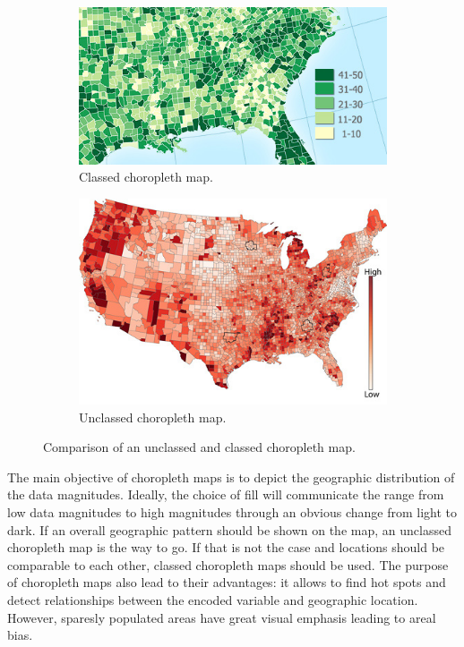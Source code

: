 \begin{figure}[!htb]
  \captionsetup[subfigure]{justification=centering}
  \centering
  \begin{subfigure}[b]{0.4\textwidth}
    \includegraphics[width=\textwidth]{images/choropleth/classed.jpg}
    \caption{Classed choropleth map.}
  \end{subfigure}
  \hfill
  \begin{subfigure}[b]{0.4\textwidth}
    \includegraphics[width=\textwidth]{images/choropleth/unclassed.jpg}
    \caption{Unclassed choropleth map.}
  \end{subfigure}
  \caption[
    Comparison of an unclassed and classed choropleth map, Urldate: 07.2016 \newline
    \small\texttt{\url{http://indiemapper.com/app/learnmore.php?l=choropleth}}
  ]{
    Comparison of an unclassed and classed choropleth map.
  }
  \label{fig:classed-unclassed-choropleth}
\end{figure}

The main objective of choropleth maps is to depict the geographic distribution of the data magnitudes. Ideally, the choice of fill will communicate the range from low data magnitudes to high magnitudes through an obvious change from light to dark. If an overall geographic pattern should be shown on the map, an unclassed choropleth map is the way to go. If that is not the case and locations should be comparable to each other, classed choropleth maps should be used.
The purpose of choropleth maps also lead to their advantages: it allows to find hot spots and detect relationships between the encoded variable and geographic location.
However, sparesly populated areas have great visual emphasis leading to areal bias.

